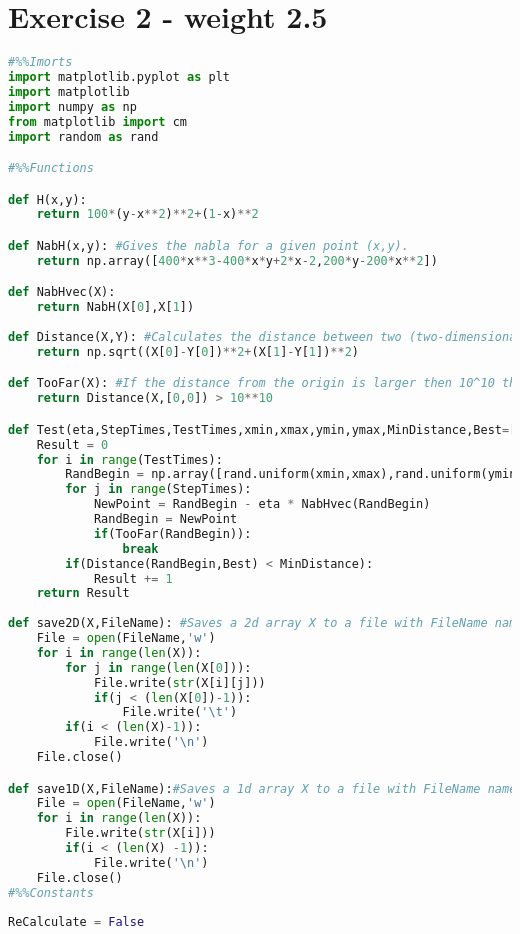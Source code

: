 \documentclass[a4paper]{article}
\begin{document}
\section*{Exercise 2 - weight 2.5}


\begin{lstlisting}[language=Python]
#%%Imorts
import matplotlib.pyplot as plt
import matplotlib
import numpy as np
from matplotlib import cm
import random as rand

#%%Functions

def H(x,y):
    return 100*(y-x**2)**2+(1-x)**2

def NabH(x,y): #Gives the nabla for a given point (x,y).
    return np.array([400*x**3-400*x*y+2*x-2,200*y-200*x**2])

def NabHvec(X): 
    return NabH(X[0],X[1])
    
def Distance(X,Y): #Calculates the distance between two (two-dimensional) vectors.
    return np.sqrt((X[0]-Y[0])**2+(X[1]-Y[1])**2)

def TooFar(X): #If the distance from the origin is larger then 10^10 this functions returns true. This because if we wander that far from the origin the next steps will lead us to values to high to calculate.
    return Distance(X,[0,0]) > 10**10

def Test(eta,StepTimes,TestTimes,xmin,xmax,ymin,ymax,MinDistance,Best=[1,1]):
    Result = 0
    for i in range(TestTimes):
        RandBegin = np.array([rand.uniform(xmin,xmax),rand.uniform(ymin,ymax)])
        for j in range(StepTimes):
            NewPoint = RandBegin - eta * NabHvec(RandBegin)
            RandBegin = NewPoint
            if(TooFar(RandBegin)):
                break
        if(Distance(RandBegin,Best) < MinDistance):
            Result += 1
    return Result
    
def save2D(X,FileName): #Saves a 2d array X to a file with FileName name.
    File = open(FileName,'w')
    for i in range(len(X)):
        for j in range(len(X[0])):
            File.write(str(X[i][j]))
            if(j < (len(X[0])-1)):
                File.write('\t')
        if(i < (len(X)-1)):
            File.write('\n')
    File.close()

def save1D(X,FileName):#Saves a 1d array X to a file with FileName name.
    File = open(FileName,'w')
    for i in range(len(X)):
        File.write(str(X[i]))
        if(i < (len(X) -1)):
            File.write('\n')
    File.close()
#%%Constants
    
ReCalculate = False


\end{lstlisting}
\end{document}
